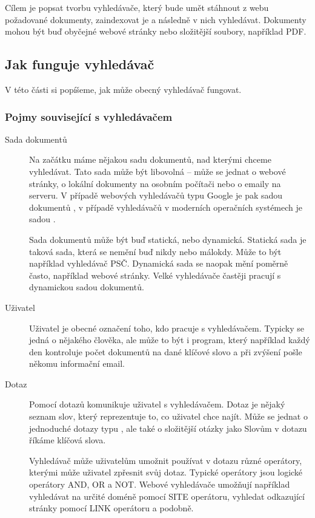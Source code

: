\documentclass[12pt]{article}
\begin{document}
Cílem je popsat tvorbu vyhledávače, který bude umět stáhnout z webu požadované dokumenty, zaindexovat je a následně v nich vyhledávat. Dokumenty mohou být buď obyčejné webové stránky nebo složitější soubory, například PDF. 

\subsection{Jak funguje vyhledávač}
V této části si popíšeme, jak může obecný vyhledávač fungovat. 

\subsubsection{Pojmy související s vyhledávačem}
\begin{description}
\item[Sada dokumentů] Na začátku máme nějakou sadu dokumentů, nad kterými chceme vyhledávat. Tato sada může být libovolná -- může se jednat o webové stránky, o lokální dokumenty na osobním počítači nebo o emaily na serveru. V případě webových vyhledávačů typu Google je pak sadou dokumentů , v případě vyhledávačů v moderních operačních systémech je sadou . 

Sada dokumentů může být buď statická, nebo dynamická. Statická sada je taková sada, která se nemění buď nikdy nebo málokdy. Může to být například vyhledávač PSČ. Dynamická sada se naopak mění poměrně často, například webové stránky. Velké vyhledávače častěji pracují s dynamickou sadou dokumentů. 

\item[Uživatel] Uživatel je obecné označení toho, kdo pracuje s vyhledávačem. Typicky se jedná o nějakého člověka, ale může to být i program, který například každý den kontroluje počet dokumentů na dané klíčové slovo a při zvýšení pošle někomu informační email. 

\item[Dotaz] Pomocí dotazů komunikuje uživatel s vyhledávačem. Dotaz je nějaký seznam slov, který reprezentuje to, co uživatel chce najít. Může se jednat o jednoduché dotazy typu , ale také o složitější otázky jako  Slovům v dotazu říkáme klíčová slova. 

Vyhledávač může uživatelům umožnit používat v dotazu různé operátory, kterými může uživatel zpřesnit svůj dotaz. Typické operátory jsou logické operátory AND, OR a NOT. Webové vyhledávače umožňují například vyhledávat na určité doméně pomocí SITE operátoru, vyhledat odkazující stránky pomocí LINK operátoru a podobně. 


\end{description}
\end{document}
